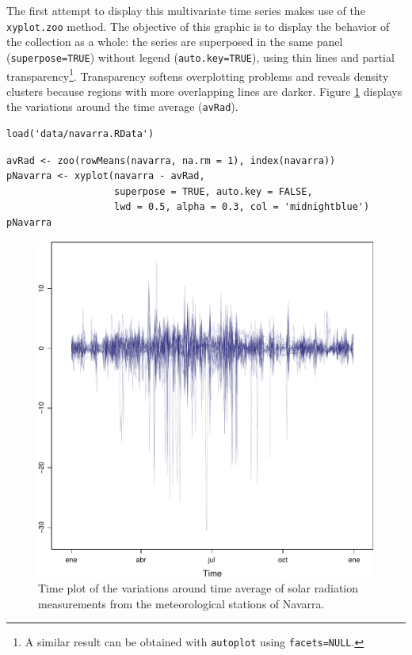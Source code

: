The first attempt to display this multivariate time series makes use
of the \texttt{xyplot.zoo} method. The objective of this graphic is to
display the behavior of the collection as a whole: the series are
superposed in the same panel (\texttt{superpose=TRUE}) without legend
(\texttt{auto.key=TRUE}), using thin lines and partial
transparency\footnote{A similar result can be obtained with \texttt{autoplot} using \texttt{facets=NULL}.}. Transparency softens overplotting problems and reveals
density clusters because regions with more overlapping lines are
darker. Figure \ref{fig:navarraNaive} displays the variations
around the time average (\texttt{avRad}).

\lstset{language=r,label= ,caption= ,captionpos=b,numbers=none}
\begin{lstlisting}
load('data/navarra.RData')
\end{lstlisting}


\lstset{language=r,label= ,caption= ,captionpos=b,numbers=none}
\begin{lstlisting}
avRad <- zoo(rowMeans(navarra, na.rm = 1), index(navarra))
pNavarra <- xyplot(navarra - avRad,
                   superpose = TRUE, auto.key = FALSE,
                   lwd = 0.5, alpha = 0.3, col = 'midnightblue') 
pNavarra
\end{lstlisting}

\begin{figure}[htbp]
\centering
\includegraphics[width=.9\linewidth]{figs/navarra.pdf}
\caption{Time plot of the variations around time average of solar radiation measurements from the meteorological stations of Navarra. \label{fig:navarraNaive}}
\end{figure}

